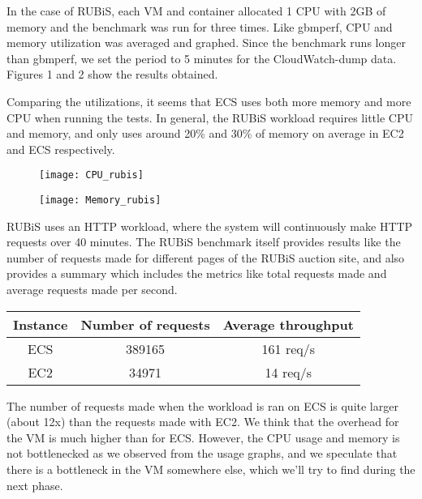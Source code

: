 \documentclass[11pt]{article}
\begin{document}
In the case of RUBiS, each VM and container allocated 1 CPU with 2GB of memory and the benchmark was run for three times. Like gbmperf, CPU and memory utilization was averaged and graphed. Since the benchmark runs longer than gbmperf, we set the period to 5 minutes for the CloudWatch-dump data. Figures 1 and 2 show the results obtained.

Comparing the utilizations, it seems that ECS uses both more memory and more CPU when running the tests. In general, the RUBiS workload requires little CPU and memory, and only uses around 20\% and 30\% of memory on average in EC2 and ECS respectively.

\begin{figure}
\centering
\begin{minipage}{.5\textwidth}
  \centering
  \texttt{[image: CPU\_rubis]}
  \label{CPU}
\end{minipage}%
\begin{minipage}{.5\textwidth}
  \centering
  \texttt{[image: Memory\_rubis]}
  \label{Memory}
\end{minipage}
\end{figure}

RUBiS uses an HTTP workload, where the system will continuously make HTTP requests over 40 minutes. The RUBiS benchmark itself provides results like the number of requests made for different pages of the RUBiS auction site, and also provides a summary which includes the metrics like total requests made and average requests made per second. 


\begin{center}

 \begin{tabular}{||c c c ||} 
 \hline
 Instance & Number of requests & Average throughput  \\ [0.5ex] 
 \hline\hline
 ECS & 389165 & 161 req/s  \\ 
 \hline
 EC2 & 34971 & 14 req/s \\ [1ex] 
 \hline
\end{tabular}
\end{center}

The number of requests made when the workload is ran on ECS is quite larger (about 12x) than the requests made with EC2. We think that the overhead for the VM is much higher than for ECS. However, the CPU usage and memory is not bottlenecked as we observed from the usage graphs, and we speculate that there is a bottleneck in the VM somewhere else, which we'll try to find during the next phase.
\end{document}
